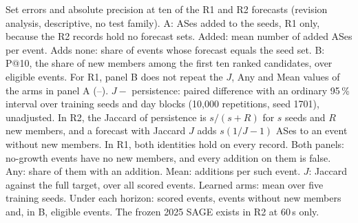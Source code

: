 \begin{table}[h]
\footnotesize
\centering
\caption{Set errors and absolute precision at ten of the R1 and R2 forecasts (revision analysis, descriptive, no test family). A: ASes added to the seeds, R1 only, because the R2 records hold no forecast sets. Added: mean number of added ASes per event. Adds none: share of events whose forecast equals the seed set. B: P@10, the share of new members among the first ten ranked candidates, over eligible events. For R1, panel B does not repeat the $J$, Any and Mean values of the arms in panel A (--). $J -$ persistence: paired difference with an ordinary 95\,\% interval over training seeds and day blocks (10,000 repetitions, seed 1701), unadjusted. In R2, the Jaccard of persistence is $s/(s+R)$ for $s$ seeds and $R$ new members, and a forecast with Jaccard $J$ adds $s(1/J-1)$ ASes to an event without new members. In R1, both identities hold on every record. Both panels: no-growth events have no new members, and every addition on them is false. Any: share of them with an addition. Mean: additions per such event. $J$: Jaccard against the full target, over all scored events. Learned arms: mean over five training seeds. Under each horizon: scored events, events without new members and, in B, eligible events. The frozen 2025 SAGE exists in R2 at 60\,s only.}
\label{tab:set-errors}
\label{tab:set-errors-r2}

\end{table}
